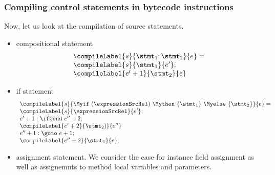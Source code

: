 \subsubsection{Compiling control statements in bytecode instructions} \label{pogEq:compile:compCtrlStmt}

Now, let us look at the compilation of source statements. 

\begin{itemize}
  \item compositional statement 
      $$\begin{array}{l} \compileLabel{s}{\stmt_1; \stmt_2}{e} = \\  
      
            \compileLabel{s}{\stmt_1}{e'};\\
	    
	    \compileLabel{e'+1}{\stmt_2}{e}
       \end{array}$$
    
  \item   if statement
    $$\begin{array}{l} \compileLabel{s}{ \Myif \ ( \expressionSrcRel ) \ \Mythen \ \{ \stmt_1 \} \  \Myelse \ \{ \stmt_2 \}   }{e} =  \\
        
	    \compileLabel{s}{\expressionSrcRel}{e'}; \\
            e' + 1: \ifCond \ e'' + 2;\\
            \compileLabel{e' + 2}{\stmt_2)}{e''}\\
             e'' + 1: \goto \ e +  1; \\
            \compileLabel{e'' +  2}{\stmt_1}{ e  }; \\
	\end{array}
    $$


\item assignment statement. We consider the case for  instance field assignment as well as  assignemnts to method local variables and parameters. 

\end{itemize}

